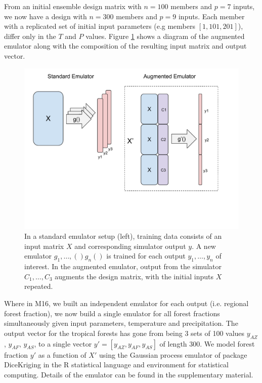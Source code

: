 \documentclass[gmd, manuscript]{copernicus}
\begin{document}
From an initial ensemble design matrix with $n=100$ members and $p=7$ inputs, we now have a design with $n=300$ members and $p=9$ inputs. Each member with a replicated set of initial input parameters (e.g members $[1, 101, 201]$), differ only in the $T$ and $P$ values. Figure \ref{fig:augmented_emulator} shows a diagram of the augmented emulator along with the composition of the resulting input matrix and output vector.

\begin{figure}[t]
\includegraphics[width=12cm]{../graphics/augmented_emulator.pdf}
\caption{In a standard emulator setup (left), training data consists of an input matrix $X$ and corresponding simulator output $y$. A new emulator $g_{1}, \ldots, ()g_{n}()$ is trained for each output $y_{1}, \ldots, y_{n}$ of interest. In the augmented emulator, output from the simulator $C_{1}, \ldots, C_{3}$ augments the design matrix, with the initial inputs $X$ repeated.}
\label{fig:augmented_emulator}
\end{figure}

Where in M16, we built an independent emulator for each output (i.e. regional forest fraction), we now build a single emulator for all forest fractions simultaneously given input parameters, temperature and precipitation. The output vector for the tropical forests has gone from being 3 sets of 100 values $y_{AZ}$, $y_{AF}$, $y_{AS}$, to a single vector $y' = [y_{AZ}, y_{AF}, y_{AS}]$ of length 300. We model forest fraction $y'$ as a function of $X'$ using the Gaussian process emulator of package DiceKriging \citep{roustant2012dicekriging} in the R statistical language and environment for statistical computing. Details of the emulator can be found in the supplementary material.
\end{document}
